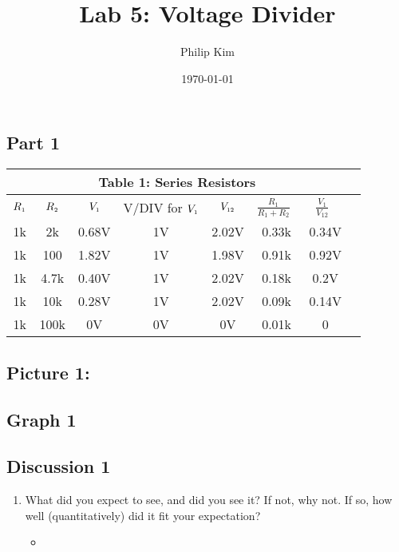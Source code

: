 \documentclass{article}
\title{Lab 5: Voltage Divider}
\author{Philip Kim}
\date{\today}
\def\R#1{\(R_{\text{\tiny#1}}\)}
\def\V#1{\(V_{\text{\tiny#1}}\)}
\def\RDIV{\(\frac{R_{\text{1}}}{R_{\text{1}}+R_{\text{2}}}\)}
\def\VDIV{\(\frac{V_{\text{1}}}{V_{\text{12}}}\)}
\begin{document}
\maketitle
\vspace*{-1cm}
\begin{table}[!htp]\centering
  \subsection*{Part 1}
  \begin{tabular}{|c|c|c|c|c|c|c|c|}\hline
  \multicolumn{7}{|c|}{\textbf{Table 1: Series Resistors}} \\\hline
  \R{1} & \R{2} & \V{1} & V/DIV for \V{1} & \V{12} & \RDIV\ & \VDIV\ \\\hline
  1k & 2k & 0.68V & 1V & 2.02V & 0.33k & 0.34V \\\hline
  1k & 100 & 1.82V & 1V & 1.98V & 0.91k & 0.92V \\\hline
  1k & 4.7k & 0.40V & 1V & 2.02V & 0.18k & 0.2V \\\hline
  1k & 10k & 0.28V & 1V & 2.02V & 0.09k & 0.14V \\\hline
  1k & 100k & 0V & 0V & 0V & 0.01k & 0 \\\hline
  \end{tabular}
  \begin{center}
    \subsection*{Picture 1: }
    \subsection*{Graph 1}
    \subsection*{Discussion 1}
    \begin{enumerate}
      \item What did you expect to see, and did you see it? If not, why not. If so, how well (quantitatively) did it fit your expectation?
      \begin{itemize}
        \item
      \end{itemize}
    \end{enumerate}
  \end{center}
\end{table}
\end{document}
